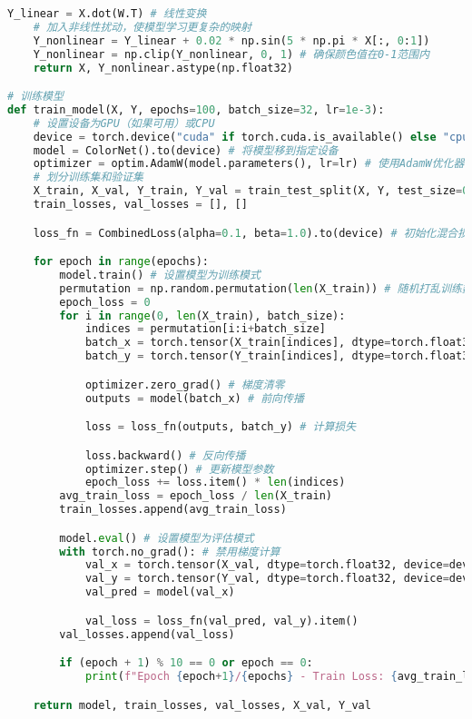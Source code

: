 \begin{lstlisting}[language=Python]
    Y_linear = X.dot(W.T) # 线性变换
    # 加入非线性扰动，使模型学习更复杂的映射
    Y_nonlinear = Y_linear + 0.02 * np.sin(5 * np.pi * X[:, 0:1])
    Y_nonlinear = np.clip(Y_nonlinear, 0, 1) # 确保颜色值在0-1范围内
    return X, Y_nonlinear.astype(np.float32)

# 训练模型
def train_model(X, Y, epochs=100, batch_size=32, lr=1e-3):
    # 设置设备为GPU（如果可用）或CPU
    device = torch.device("cuda" if torch.cuda.is_available() else "cpu")
    model = ColorNet().to(device) # 将模型移到指定设备
    optimizer = optim.AdamW(model.parameters(), lr=lr) # 使用AdamW优化器
    # 划分训练集和验证集
    X_train, X_val, Y_train, Y_val = train_test_split(X, Y, test_size=0.2, random_state=42)
    train_losses, val_losses = [], []

    loss_fn = CombinedLoss(alpha=0.1, beta=1.0).to(device) # 初始化混合损失函数

    for epoch in range(epochs):
        model.train() # 设置模型为训练模式
        permutation = np.random.permutation(len(X_train)) # 随机打乱训练数据
        epoch_loss = 0
        for i in range(0, len(X_train), batch_size):
            indices = permutation[i:i+batch_size]
            batch_x = torch.tensor(X_train[indices], dtype=torch.float32, device=device)
            batch_y = torch.tensor(Y_train[indices], dtype=torch.float32, device=device)

            optimizer.zero_grad() # 梯度清零
            outputs = model(batch_x) # 前向传播

            loss = loss_fn(outputs, batch_y) # 计算损失

            loss.backward() # 反向传播
            optimizer.step() # 更新模型参数
            epoch_loss += loss.item() * len(indices)
        avg_train_loss = epoch_loss / len(X_train)
        train_losses.append(avg_train_loss)

        model.eval() # 设置模型为评估模式
        with torch.no_grad(): # 禁用梯度计算
            val_x = torch.tensor(X_val, dtype=torch.float32, device=device)
            val_y = torch.tensor(Y_val, dtype=torch.float32, device=device)
            val_pred = model(val_x)

            val_loss = loss_fn(val_pred, val_y).item()
        val_losses.append(val_loss)

        if (epoch + 1) % 10 == 0 or epoch == 0:
            print(f"Epoch {epoch+1}/{epochs} - Train Loss: {avg_train_loss:.6f} - Val Loss: {val_loss:.6f}")

    return model, train_losses, val_losses, X_val, Y_val


\end{lstlisting}
